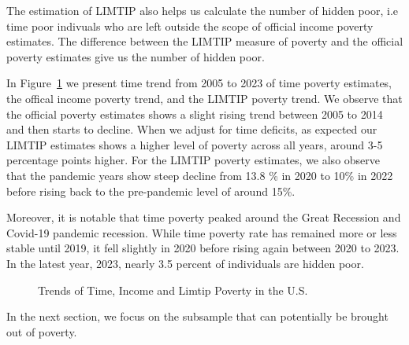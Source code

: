 \documentclass[
  11pt,
]{article}
\begin{document}
The estimation of LIMTIP also helps us calculate the number of hidden
poor, i.e time poor indivuals who are left outside the scope of official
income poverty estimates. The difference between the LIMTIP measure of
poverty and the official poverty estimates give us the number of hidden
poor.

In Figure~\ref{fig-trend} we present time trend from 2005 to 2023 of
time poverty estimates, the offical income poverty trend, and the LIMTIP
poverty trend. We observe that the official poverty estimates shows a
slight rising trend between 2005 to 2014 and then starts to decline.
When we adjust for time deficits, as expected our LIMTIP estimates shows
a higher level of poverty across all years, around 3-5 percentage points
higher. For the LIMTIP poverty estimates, we also observe that the
pandemic years show steep decline from 13.8 \% in 2020 to 10\% in 2022
before rising back to the pre-pandemic level of around 15\%.

Moreover, it is notable that time poverty peaked around the Great
Recession and Covid-19 pandemic recession. While time poverty rate has
remained more or less stable until 2019, it fell slightly in 2020 before
rising again between 2020 to 2023. In the latest year, 2023, nearly 3.5
percent of individuals are hidden poor.

\begin{figure}


\caption{\label{fig-trend}Trends of Time, Income and Limtip Poverty in
the U.S.}

\end{figure}%

In the next section, we focus on the subsample that can potentially be
brought out of poverty.
\end{document}
